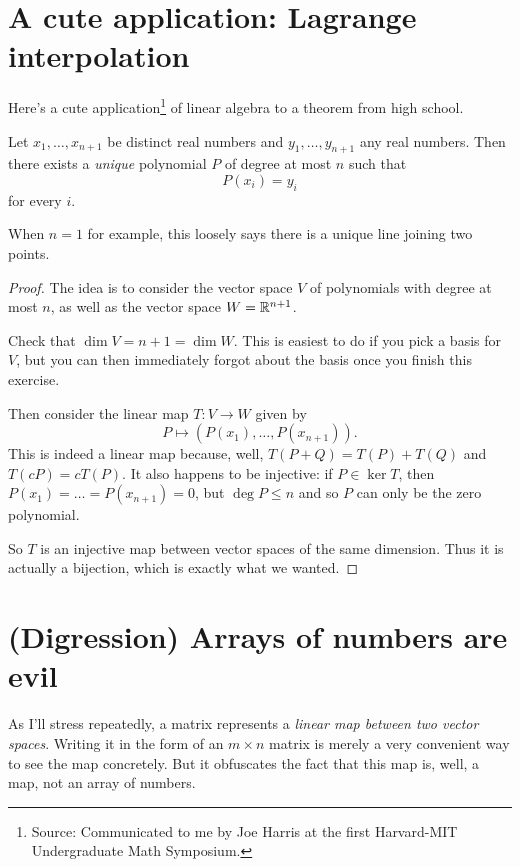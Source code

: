 \section{A cute application: Lagrange interpolation}
Here's a cute application\footnote{Source: Communicated to me
by Joe Harris at the first Harvard-MIT Undergraduate Math Symposium.}
of linear algebra to a theorem from high school.
\begin{theorem}
	Let $x_1, \dots, x_{n+1}$ be distinct real numbers
	and $y_1, \dots, y_{n+1}$ any real numbers.
	Then there exists a \emph{unique}
	polynomial $P$ of degree at most $n$
	such that \[ P(x_i) = y_i \] for every $i$.
\end{theorem}
When $n = 1$ for example, this loosely
says there is a unique line joining two points.
\begin{proof}
	The idea is to consider the vector space $V$
	of polynomials with degree at most $n$,
	as well as the vector space $W = \mathbb R^{n+1}$.
	\begin{ques}
		Check that $\dim V = n + 1 = \dim W$.
		This is easiest to do if you pick a basis for $V$,
		but you can then immediately forgot about the basis
		once you finish this exercise.
	\end{ques}
	Then consider the linear map $T : V \to W$ given by
	\[ P \mapsto \left( P(x_1), \dots, P(x_{n+1}) \right). \]
	This is indeed a linear map because,
	well, $T(P+Q) = T(P)+T(Q)$ and $T(cP) = cT(P)$.
	It also happens to be injective: if $P \in \ker T$,
	then $P(x_1) = \dots = P(x_{n+1}) = 0$,
	but $\deg P \le n$ and so $P$ can only be the zero polynomial.
	
	So $T$ is an injective map between vector spaces of the same dimension.
	Thus it is actually a bijection, which is exactly what we wanted.
\end{proof}

\section{(Digression) Arrays of numbers are evil}
\label{sec:basis_evil}
As I'll stress repeatedly, a matrix represents a
\emph{linear map between two vector spaces}.
Writing it in the form of an $m \times n$ matrix
is merely a very convenient way to see the map concretely.
But it obfuscates the fact that this map is,
well, a map, not an array of numbers.

